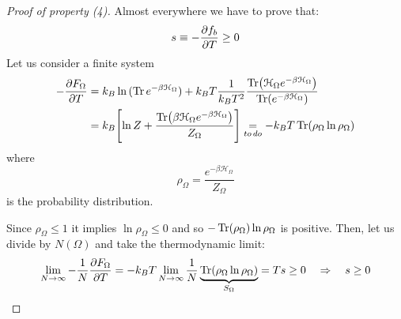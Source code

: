 \documentclass[../main/main.tex]{subfiles}
\begin{document}
\begin{proof} [Proof of property (4)]
  Almost everywhere we have to prove that:
  \begin{equation*}
    s \equiv - \pdv{f_b}{T} \ge 0
  \end{equation*}
  Let us consider a finite system
  \begin{equation}
  \begin{split}
  - \pdv{F_ \Omega }{T}   &= k_B \ln{(\Tr e^{- \beta \mathcal{H}_ \Omega }  )} + k_B T \frac{1}{k_B T^2} \frac{\Tr(\mathcal{H}_ \Omega  e^{-\beta \mathcal{H}_ \Omega } ) }{\Tr(e^{- \beta \mathcal{H}_ \Omega } ) } \\
  &= k_B \qty[\ln{Z} + \frac{\Tr(\beta \mathcal{H}_ \Omega e^{-\beta \mathcal{H}_ \Omega
  } ) }{Z_ \Omega } ] \underset{to\, do}{=}   - k_B T \Tr(\rho _ \Omega  \ln{\rho _ \Omega } )
  \end{split}
  \end{equation}
  where
  \begin{equation}
    \rho _ \Omega  = \frac{e^{-\beta \mathcal{H}_ \Omega } }{Z_ \Omega  }
  \end{equation}
  is the probability distribution.

  Since \( \rho _ \Omega \le 1 \) it implies \( \ln{\rho _ \Omega } \le 0  \) and so \( - \Tr(\rho _ \Omega ) \ln{\rho _ \Omega }   \) is positive. Then, let us divide by \( N (\Omega ) \) and take the thermodynamic limit:
  \begin{equation}
  \lim_{N \rightarrow \infty } - \frac{1}{N} \pdv{F_ \Omega }{T}   = - k_B T  \lim_{N \rightarrow \infty }  \frac{1}{N}  \underbrace{\Tr(\rho _ \Omega  \ln{\rho _ \Omega })}_{S _ \Omega }  = T s \ge 0  \quad \Rightarrow \quad s \ge 0
  \end{equation}
\end{proof}
\end{document}
